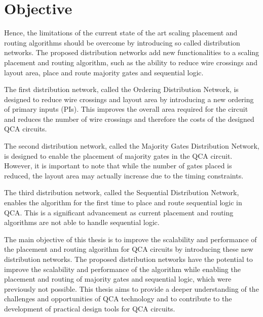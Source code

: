 \section{Objective}
Hence, the limitations of the current state of the art scaling placement and routing algorithms should be overcome by introducing so called distribution networks. The proposed distribution networks add new functionalities to a scaling placement and routing algorithm, such as the ability to reduce wire crossings and layout area, place and route majority gates and sequential logic.

The first distribution network, called the Ordering Distribution Network, is designed to reduce wire crossings and layout area by introducing a new ordering of primary inputs (PIs). This improves the overall area required for the circuit and reduces the number of wire crossings and therefore the costs of the designed QCA circuits.

The second distribution network, called the Majority Gates Distribution Network, is designed to enable the placement of majority gates in the QCA circuit. However, it is important to note that while the number of gates placed is reduced, the layout area may actually increase due to the timing constraints.

The third distribution network, called the Sequential Distribution Network, enables the algorithm for the first time to place and route sequential logic in QCA. This is a significant advancement as current placement and routing algorithms are not able to handle sequential logic.

The main objective of this thesis is to improve the scalability and performance of the placement and routing algorithm for QCA circuits by introducing these new distribution networks. The proposed distribution networks have the potential to improve the scalability and performance of the algorithm while enabling the placement and routing of majority gates and sequential logic, which were previously not possible. This thesis aims to provide a deeper understanding of the challenges and opportunities of QCA technology and to contribute to the development of practical design tools for QCA circuits.

